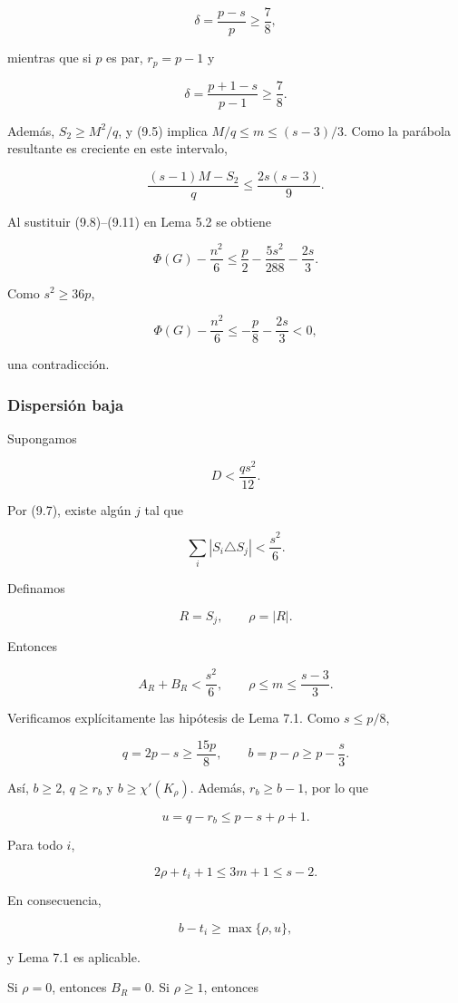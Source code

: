 \documentclass[
  11pt,
]{article}
\begin{document}
\[
\delta=\frac{p-s}{p}\ge\frac78,
\]

mientras que si \(p\) es par, \(r_p=p-1\) y

\[
\delta=\frac{p+1-s}{p-1}\ge\frac78.
\]

Además, \(S_2\ge M^2/q\), y (9.5) implica \(M/q\le m\le(s-3)/3\). Como la parábola resultante es creciente en este intervalo,

\[
\frac{(s-1)M-S_2}{q}
\le
\frac{2s(s-3)}9.
\tag{9.11}
\]

Al sustituir (9.8)--(9.11) en Lema 5.2 se obtiene

\[
\Phi(G)-\frac{n^2}{6}
\le
\frac p2-\frac{5s^2}{288}-\frac{2s}{3}.
\tag{9.12}
\]

Como \(s^2\ge36p\),

\[
\Phi(G)-\frac{n^2}{6}
\le
-\frac p8-\frac{2s}{3}<0,
\]

una contradicción.

\subsubsection{Dispersión baja}\label{dispersiuxf3n-baja}

Supongamos

\[
D<\frac{qs^2}{12}.
\tag{9.13}
\]

Por (9.7), existe algún \(j\) tal que

\[
\sum_i|S_i\triangle S_j|
<
\frac{s^2}{6}.
\tag{9.14}
\]

Definamos

\[
R=S_j,
\qquad
\rho=|R|.
\]

Entonces

\[
A_R+B_R<\frac{s^2}{6},
\qquad
\rho\le m\le\frac{s-3}{3}.
\tag{9.15}
\]

Verificamos explícitamente las hipótesis de Lema 7.1. Como \(s\le p/8\),

\[
q=2p-s\ge\frac{15p}{8},
\qquad
b=p-\rho\ge p-\frac s3.
\]

Así, \(b\ge2\), \(q\ge r_b\) y \(b\ge\chi'(K_\rho)\). Además, \(r_b\ge b-1\), por lo que

\[
u=q-r_b\le p-s+\rho+1.
\]

Para todo \(i\),

\[
2\rho+t_i+1
\le
3m+1
\le
s-2.
\]

En consecuencia,

\[
b-t_i\ge\max\{\rho,u\},
\]

y Lema 7.1 es aplicable.

Si \(\rho=0\), entonces \(B_R=0\). Si \(\rho\ge1\), entonces
\end{document}
